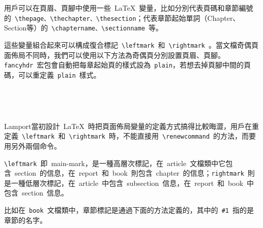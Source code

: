 用戶可以在頁眉、頁腳中使用一些~\LaTeX~變量，比如分別代表頁碼和章節編號的~\verb|\thepage、\thechapter、\thesection|；代表章節起始單詞（Chapter、Section等）的~\verb|\chaptername、\sectionname|~等。

這些變量組合起來可以構成復合標記~\verb|\leftmark|~和~\verb|\rightmark|~。當文檔奇偶頁面佈局不同時，我們可以使用以下方法為奇偶頁分別設置頁眉、頁腳。\verb|fancyhdr|~宏包會自動把每章起始頁的樣式設為~\verb|plain|，若想去掉頁腳中間的頁碼，可以重定義~\verb|plain|~樣式。

\begin{code}
\pagestyle{fancy}
\fancyhf{}                  %
\fancyhead[LE,RO]{\thepage} %
\fancyhead[RE]{\leftmark}   %
\fancyhead[LO]{\rightmark}  %
\end{code}

\ \\

\ \\

Lamport當初設計~\LaTeX~時把頁面佈局變量的定義方式搞得比較晦澀，用戶在重定義~\verb|\leftmark|~和~\verb|\rightmark|~時，不能直接用~\verb|\renewcommand|~的方法，而要用另外兩個命令。

\begin{code}
\end{code}

\verb|\leftmark|~即~main-mark，是一種高層次標記，在~article~文檔類中它包含~section~的信息，在~report~和~book~則包含~chapter~的信息；\verb|rightmark|~則是一種低層次標記，在~article~中包含~subsection~信息，在~report~和~book~中包含~section~信息。

比如在~\verb|book|~文檔類中，章節標記是通過下面的方法定義的，其中的~\verb|#1|~指的是章節的名字。

\begin{code}
\renewcommand\chaptermark[1]{\markboth{\chaptername \thechapter. 
    #1}{}}
\renewcommand\sectionmark[1]{\markright{\thesection. #1}}
\end{code}




\newpage


